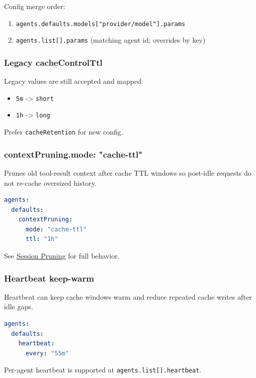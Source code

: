 Config merge order:

\begin{enumerate}
  \item \texttt{agents.defaults.models["provider/model"].params}
  \item \texttt{agents.list[].params} (matching agent id; overrides by key)
\end{enumerate}


\subsubsection{Legacy cacheControlTtl}


Legacy values are still accepted and mapped:

\begin{itemize}
  \item \texttt{5m} -> \texttt{short}
  \item \texttt{1h} -> \texttt{long}
\end{itemize}


Prefer \texttt{cacheRetention} for new config.

\subsubsection{contextPruning.mode: "cache-ttl"}


Prunes old tool-result context after cache TTL windows so post-idle requests do not re-cache oversized history.

\begin{lstlisting}[language=yaml]
agents:
  defaults:
    contextPruning:
      mode: "cache-ttl"
      ttl: "1h"
\end{lstlisting}


See \href{/concepts/session-pruning}{Session Pruning} for full behavior.

\subsubsection{Heartbeat keep-warm}


Heartbeat can keep cache windows warm and reduce repeated cache writes after idle gaps.

\begin{lstlisting}[language=yaml]
agents:
  defaults:
    heartbeat:
      every: "55m"
\end{lstlisting}


Per-agent heartbeat is supported at \texttt{agents.list[].heartbeat}.

